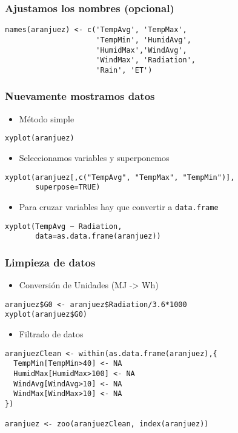 \documentclass{beamer}
\begin{document}
\begin{frame}[fragile]
\frametitle{Ajustamos los nombres (opcional)}
\label{sec-3-3}


\lstset{language=R}
\begin{lstlisting}
names(aranjuez) <- c('TempAvg', 'TempMax',
                     'TempMin', 'HumidAvg',
                     'HumidMax','WindAvg',
                     'WindMax', 'Radiation',
                     'Rain', 'ET')
\end{lstlisting}
\end{frame}
\begin{frame}[fragile]
\frametitle{Nuevamente mostramos datos}
\label{sec-3-4}

\begin{itemize}
\item Método simple
\end{itemize}

\lstset{language=R}
\begin{lstlisting}
xyplot(aranjuez)
\end{lstlisting}
\begin{itemize}
\item Seleccionamos variables y superponemos
\end{itemize}

\lstset{language=R}
\begin{lstlisting}
xyplot(aranjuez[,c("TempAvg", "TempMax", "TempMin")],
       superpose=TRUE)
\end{lstlisting}
\begin{itemize}
\item Para cruzar variables hay que convertir a \texttt{data.frame}
\end{itemize}

\lstset{language=R}
\begin{lstlisting}
xyplot(TempAvg ~ Radiation,
       data=as.data.frame(aranjuez))
\end{lstlisting}
\end{frame}
\begin{frame}[fragile]
\frametitle{Limpieza de datos}
\label{sec-3-5}

\begin{itemize}
\item Conversión de Unidades (MJ -> Wh)
\end{itemize}

\lstset{language=R}
\begin{lstlisting}
aranjuez$G0 <- aranjuez$Radiation/3.6*1000
xyplot(aranjuez$G0)
\end{lstlisting}
\begin{itemize}
\item Filtrado de datos
\end{itemize}

\lstset{language=R}
\begin{lstlisting}
aranjuezClean <- within(as.data.frame(aranjuez),{
  TempMin[TempMin>40] <- NA
  HumidMax[HumidMax>100] <- NA
  WindAvg[WindAvg>10] <- NA
  WindMax[WindMax>10] <- NA
})

aranjuez <- zoo(aranjuezClean, index(aranjuez))
\end{lstlisting}
\end{frame}
\end{document}
